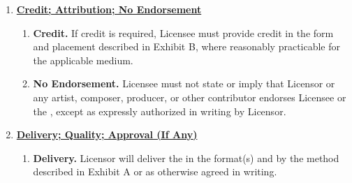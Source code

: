 \begin{enumerate}[leftmargin=*, label=\arabic*.]
\begin{enumerate}[leftmargin=*, label=\arabic{enumi}.\arabic*]
		\item \textbf{No Derivative Works / Editing.} Licensee may not create \derivativeWorks
		from the \licensedIP unless Exhibit B expressly permits specific derivatives.
		Notwithstanding the foregoing, Licensee may make technical edits strictly necessary for
		the \permittedUses (e.g., trimming, fading, looping, volume normalization, file format
		conversion), provided such edits do not materially alter the character of the
		\licensedIP and do not create a standalone exploit.

		\item \textbf{No Use in Prohibited Contexts.} If Exhibit B includes prohibited
		industries, messages, or categories, Licensee must comply with those restrictions.

		\item \textbf{Compliance With Platform Rules.} Licensee is responsible for compliance
		with all platform and distributor rules applicable to its use of the \licensedIP.
	\end{enumerate}

	\item \textbf{\uline{Credit; Attribution; No Endorsement}}

	\begin{enumerate}[leftmargin=*, label=\arabic{enumi}.\arabic*]
		\item \textbf{Credit.} If credit is required, Licensee must provide credit in the form
		and placement described in Exhibit B, where reasonably practicable for the applicable
		medium.

		\item \textbf{No Endorsement.} Licensee must not state or imply that Licensor or any
		artist, composer, producer, or other contributor endorses Licensee or the \project,
		except as expressly authorized in writing by Licensor.
	\end{enumerate}

	\item \textbf{\uline{Delivery; Quality; Approval (If Any)}}

	\begin{enumerate}[leftmargin=*, label=\arabic{enumi}.\arabic*]
		\item \textbf{Delivery.} Licensor will deliver the \licensedIP in the format(s) and by
		the method described in Exhibit A or as otherwise agreed in writing.


\end{enumerate}
\end{enumerate}

